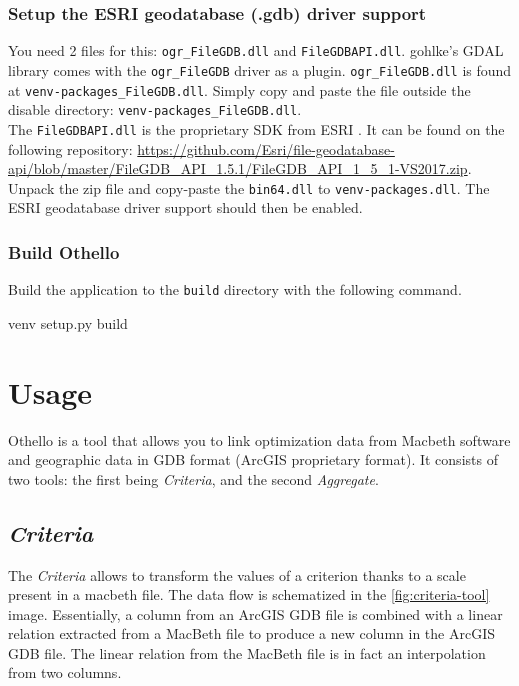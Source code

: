 \documentclass[11pt]{article}
\begin{document}
\subsubsection{Setup the ESRI geodatabase (.gdb) driver support}
\noindent You need 2 files for this: \texttt{ogr\_FileGDB.dll} and \texttt{FileGDBAPI.dll}.
gohlke's GDAL library comes with the \texttt{ogr\_FileGDB} driver as a plugin.
\texttt{ogr\_FileGDB.dll} is found at \texttt{venv\Lib\site-packages\osgeo\gdalplugins\disable\ogr\_FileGDB.dll}.
Simply copy and paste the file outside the disable directory: \texttt{venv\Lib\site-packages\osgeo\gdalplugins\ogr\_FileGDB.dll}. \\


\noindent The \texttt{FileGDBAPI.dll} is the proprietary SDK from ESRI .
It can be found on the following repository: \url{https://github.com/Esri/file-geodatabase-api/blob/master/FileGDB_API_1.5.1/FileGDB_API_1_5_1-VS2017.zip}.
Unpack the zip file and copy-paste the \texttt{bin64\FileGDPAPI.dll} to \texttt{venv\Lib\site-packages\osgeo\FileGDPAPI.dll}.
The ESRI geodatabase driver support should then be enabled.

\subsubsection{Build Othello}
\noindent Build the application to the \texttt{build} directory with the following command.
\begin{code}
venv\Scripts{} setup.py build
\end{code}


\newpage
\section{Usage}\label{sec:usage}
Othello is a tool that allows you to link optimization data from Macbeth software
and geographic data in GDB format (ArcGIS proprietary format).
It consists of two tools: the first being \textit{Criteria}, and the second \textit{Aggregate}.

\subsection{\textit{Criteria}}\label{subsec:criteria}
The \textit{Criteria} allows to transform the values of a criterion thanks
to a scale present in a macbeth file.
The data flow is schematized in the \ref{fig:criteria-tool} image.
Essentially, a column from an ArcGIS GDB file is combined
with a linear relation extracted from a MacBeth file to produce
a new column in the ArcGIS GDB file.
The linear relation from the MacBeth file is in fact an interpolation from two columns.
\end{document}
